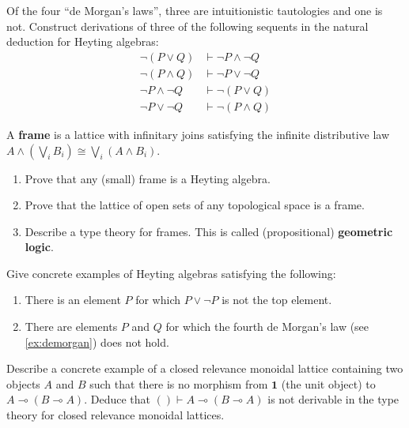 \documentclass{book}
\let\types\vdash
\let\meet\wedge
\let\join\vee
\let\bigjoin\bigvee
\def\one{\mathbf{1}}
\let\hom\multimap
\begin{document}
\begin{ex}\label{ex:demorgan}
  Of the four ``de Morgan's laws'', three are intuitionistic tautologies and one is not.
  Construct derivations of three of the following sequents in the natural deduction for Heyting algebras:
  \begin{align*}
    \neg(P\join Q) &\types \neg P \meet \neg Q\\
    \neg(P\meet Q) &\types \neg P \join \neg Q\\
    \neg P \meet \neg Q &\types \neg(P\join Q)\\
    \neg P \join \neg Q &\types \neg(P\meet Q)
  \end{align*}
\end{ex}

\begin{ex}\label{ex:frames}
  A \textbf{frame} is a lattice with infinitary joins satisfying the infinite distributive law $A \meet \left(\bigjoin_i B_i\right) \cong \bigjoin_i (A\meet B_i)$.
  \begin{enumerate}
  \item Prove that any (small) frame is a Heyting algebra.
  \item Prove that the lattice of open sets of any topological space is a frame.
  \item Describe a type theory for frames.  This is called (propositional) \textbf{geometric logic}.
  \end{enumerate}
\end{ex}

\begin{ex}\label{ex:not-lem}
  Give concrete examples of Heyting algebras satisfying the following:
  \begin{enumerate}
  \item There is an element $P$ for which $P\join \neg P$ is not the top element.
  \item There are elements $P$ and $Q$ for which the fourth de Morgan's law (see \cref{ex:demorgan}) does not hold.
  \end{enumerate}
\end{ex}

\begin{ex}\label{ex:relevance-eg}
  Describe a concrete example of a closed relevance monoidal lattice containing two objects $A$ and $B$ such that there is no morphism from $\one$ (the unit object) to $A\hom (B\hom A)$.
  Deduce that $()\types A\hom (B\hom A)$ is not derivable in the type theory for closed relevance monoidal lattices.
\end{ex}
\end{document}
